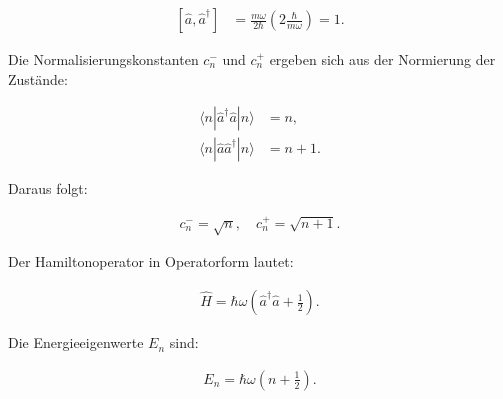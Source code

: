 \begin{align*}
\left[\hat{a}, \hat{a}^{\dagger}\right] &= \frac{m \omega}{2 \hbar} \left(2 \frac{\hbar}{m \omega}\right) = 1.
\end{align*}

Die Normalisierungskonstanten $c_n^{-}$ und $c_n^{+}$ ergeben sich aus der Normierung der Zustände:

\begin{align*}
\langle n | \hat{a}^{\dagger} \hat{a} | n \rangle &= n, \\
\langle n | \hat{a} \hat{a}^{\dagger} | n \rangle &= n + 1.
\end{align*}

Daraus folgt:

\begin{align*}
c_n^{-} = \sqrt{n}, \quad c_n^{+} = \sqrt{n+1}.
\end{align*}

Der Hamiltonoperator in Operatorform lautet:

\begin{align*}
\hat{H} = \hbar \omega \left(\hat{a}^{\dagger} \hat{a} + \frac{1}{2}\right).
\end{align*}

Die Energieeigenwerte $E_n$ sind:

\begin{align*}
E_n = \hbar \omega \left(n + \frac{1}{2}\right).
\end{align*}

